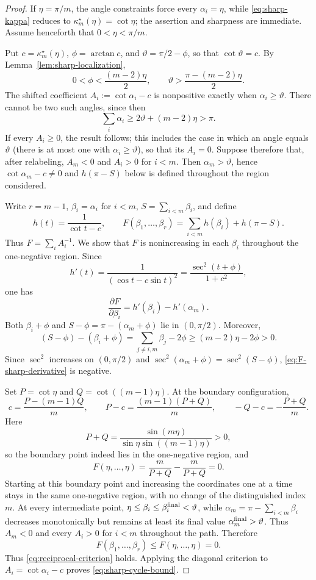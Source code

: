 \documentclass[11pt]{article}
\theoremstyle{definition}
\begin{document}
\begin{proof}
If $\eta=\pi/m$, the angle constraints force every $\alpha_i=\eta$, while
\eqref{eq:sharp-kappa} reduces to
$\kappa_m^\star(\eta)=\cot\eta$; the assertion and sharpness are immediate.
Assume henceforth that $0<\eta<\pi/m$.

Put $c=\kappa_m^\star(\eta)$, $\phi=\arctan c$, and
$\vartheta=\pi/2-\phi$, so that $\cot\vartheta=c$.  By
Lemma~\ref{lem:sharp-localization},
\begin{equation}\label{eq:phi-bound}
 0<\phi<\frac{(m-2)\eta}{2},
 \qquad
 \vartheta>\frac{\pi-(m-2)\eta}{2}.
\end{equation}
The shifted coefficient $A_i:=\cot\alpha_i-c$ is nonpositive exactly when
$\alpha_i\geq\vartheta$.  There cannot be two such angles, since then
\[
 \sum_i\alpha_i\geq2\vartheta+(m-2)\eta>\pi.
\]
If every $A_i\geq0$, the result follows; this includes the case in which
an angle equals $\vartheta$ (there is at most one with $\alpha_i\geq\vartheta$), so
that its $A_i=0$.  Suppose therefore that, after relabeling, $A_m<0$ and $A_i>0$
for $i<m$.  Then $\alpha_m>\vartheta$, hence $\cot\alpha_m-c\neq0$ and
$h(\pi-S)$ below is defined throughout the region considered.

Write $r=m-1$, $\beta_i=\alpha_i$ for $i<m$,
$S=\sum_{i<m}\beta_i$, and define
\[
 h(t)=\frac1{\cot t-c},\qquad
 F(\beta_1,\ldots,\beta_r)
 =\sum_{i<m}h(\beta_i)+h(\pi-S).
\]
Thus $F=\sum_iA_i^{-1}$.  We show that $F$ is nonincreasing in each
$\beta_i$ throughout the one-negative region.  Since
\[
 h'(t)=\frac1{(\cos t-c\sin t)^2}
 =\frac{\sec^2(t+\phi)}{1+c^2},
\]
one has
\begin{equation}\label{eq:F-sharp-derivative}
 \frac{\partial F}{\partial\beta_i}
 =h'(\beta_i)-h'(\alpha_m).
\end{equation}
Both $\beta_i+\phi$ and
$S-\phi=\pi-(\alpha_m+\phi)$ lie in $(0,\pi/2)$.  Moreover,
\[
 (S-\phi)-(\beta_i+\phi)
 =\sum_{j\neq i,m}\beta_j-2\phi
 \geq(m-2)\eta-2\phi>0.
\]
Since $\sec^2$ increases on $(0,\pi/2)$ and
$\sec^2(\alpha_m+\phi)=\sec^2(S-\phi)$,
\eqref{eq:F-sharp-derivative} is negative.

Set $P=\cot\eta$ and $Q=\cot((m-1)\eta)$.  At the boundary
configuration,
\[
 c=\frac{P-(m-1)Q}{m},\qquad
 P-c=\frac{(m-1)(P+Q)}m,\qquad
 -Q-c=-\frac{P+Q}{m}.
\]
Here
\[
 P+Q=\frac{\sin(m\eta)}{\sin\eta\sin((m-1)\eta)}>0,
\]
so the boundary point indeed lies in the one-negative region, and
\[
 F(\eta,\ldots,\eta)
 =\frac{m}{P+Q}-\frac{m}{P+Q}=0.
\]
Starting at this boundary point and increasing the coordinates one at a time
stays in the same one-negative region, with no change of the distinguished
index \(m\). At every intermediate point,
\(\eta\leq\beta_i\leq\beta_i^{\rm final}<\vartheta\), while
\(\alpha_m=\pi-\sum_{i<m}\beta_i\) decreases monotonically but remains at
least its final value \(\alpha_m^{\rm final}>\vartheta\). Thus \(A_m<0\)
and every \(A_i>0\) for \(i<m\) throughout the path. Therefore
\begin{equation}\label{eq:F-boundary-max}
 F(\beta_1,\ldots,\beta_r)\leq F(\eta,\ldots,\eta)=0.
\end{equation}
Thus \eqref{eq:reciprocal-criterion} holds.  Applying the diagonal criterion
to $A_i=\cot\alpha_i-c$ proves \eqref{eq:sharp-cycle-bound}.


\end{proof}
\end{document}
